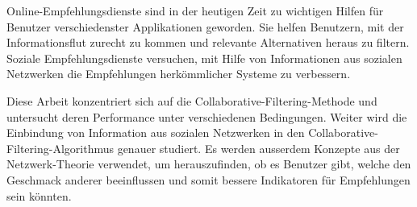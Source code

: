 \begin{zusammenfassung}
Online-Empfehlungsdienste sind in der heutigen Zeit zu wichtigen Hilfen f\"ur Benutzer verschiedenster Applikationen geworden. Sie helfen Benutzern, mit der Informationsflut zurecht zu kommen und relevante Alternativen heraus zu filtern. Soziale Empfehlungsdienste versuchen, mit Hilfe von Informationen aus sozialen Netzwerken die Empfehlungen herk\"ommlicher Systeme zu verbessern.

Diese Arbeit konzentriert sich auf die Collaborative-Filtering-Methode und untersucht deren Performance unter verschiedenen Bedingungen. Weiter wird die Einbindung von Information aus sozialen Netzwerken in den Collaborative-Filtering-Algorithmus genauer studiert. Es werden ausserdem Konzepte aus der Netzwerk-Theorie verwendet, um herauszufinden, ob es Benutzer gibt, welche den Geschmack anderer beeinflussen und somit bessere Indikatoren f\"ur Empfehlungen sein k\"onnten.
\end{zusammenfassung}
